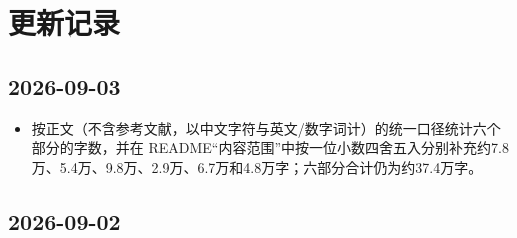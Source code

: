 \hypertarget{ux66f4ux65b0ux8bb0ux5f55}{%
\chapter{更新记录}\label{ux66f4ux65b0ux8bb0ux5f55}}

\hypertarget{section}{%
\section{2026-09-03}\label{section}}

\begin{itemize}
\tightlist
\item
  按正文（不含参考文献，以中文字符与英文/数字词计）的统一口径统计六个部分的字数，并在 README``内容范围''中按一位小数四舍五入分别补充约7.8万、5.4万、9.8万、2.9万、6.7万和4.8万字；六部分合计仍为约37.4万字。
\end{itemize}

\hypertarget{section-1}{%
\section{2026-09-02}\label{section-1}}

